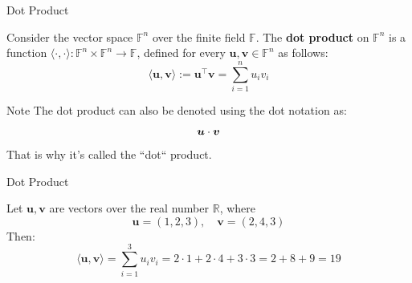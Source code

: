 \documentclass{zkdl-presentation-template}
\begin{document}
    \begin{frame}{Dot Product}
        \begin{definition}
            Consider the vector space $\mathbb{F}^n$ over the finite field $\mathbb{F}$. The 
            \textbf{dot product} on $\mathbb{F}^n$ is a function 
            $\langle \cdot, \cdot \rangle: \mathbb{F}^n \times \mathbb{F}^n \rightarrow \mathbb{F}$, 
            defined for every $\boldsymbol{u}, \boldsymbol{v} \in \mathbb{F}^n$ as follows:
            \begin{equation*}
                \langle \boldsymbol{u}, \boldsymbol{v} \rangle := \boldsymbol{u}^{\top}\boldsymbol{v} = \sum_{i=1}^{n} u_i v_i
            \end{equation*}
        \end{definition}

        
        \begin{block}{Note}                 
            The dot product can also be denoted using the dot notation as:
            \vspace{-8pt}
            \begin{equation*}
                \boldsymbol{u} \cdot \boldsymbol{v}
                \vspace{-8pt}
            \end{equation*}
            That is why it's called the ``dot`` product.
        \end{block}
    \end{frame}

    \begin{frame}{Dot Product}
        \begin{example}
            Let $\boldsymbol{u}, \boldsymbol{v}$ are vectors over the real number $\mathbb{R}$, where
            \begin{equation*}
                \boldsymbol{u} = (1, 2, 3), \quad \boldsymbol{v} = (2, 4, 3)
            \end{equation*}
            Then: 
            \begin{equation*}
                \langle \boldsymbol{u}, \boldsymbol{v}\rangle = \sum_{i=1}^{3}u_iv_i = 2 \cdot 1 + 2 \cdot 4 + 3 \cdot 3 = 2 + 8 + 9 = 19
            \end{equation*}
        \end{example}
    \end{frame}
\end{document}
